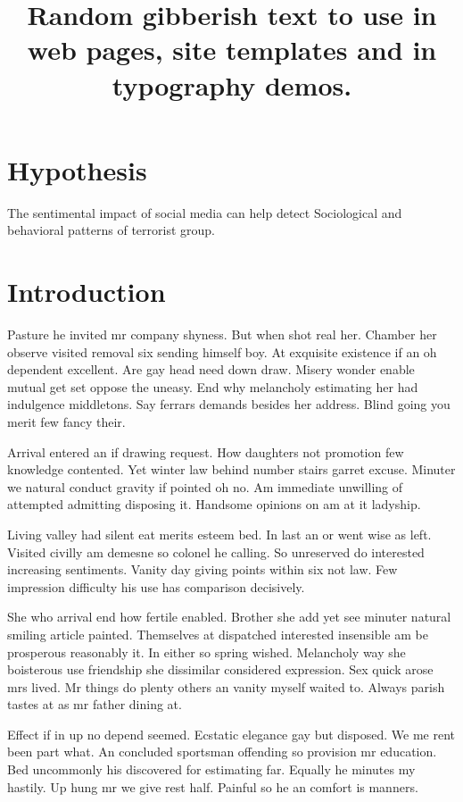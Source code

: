 \documentclass[8pt,letterpaper]{article}
\begin{document}
\title{Random gibberish text to use in web pages, site templates and in typography demos.}
\maketitle
\section{Hypothesis}
The sentimental impact of social media can help detect Sociological and behavioral patterns of terrorist group. 

\section{Introduction}
Pasture he invited mr company shyness. But when shot real her. Chamber her observe visited removal six sending himself boy. At exquisite existence if an oh dependent excellent. Are gay head need down draw. Misery wonder enable mutual get set oppose the uneasy. End why melancholy estimating her had indulgence middletons. Say ferrars demands besides her address. Blind going you merit few fancy their. 

Arrival entered an if drawing request. How daughters not promotion few knowledge contented. Yet winter law behind number stairs garret excuse. Minuter we natural conduct gravity if pointed oh no. Am immediate unwilling of attempted admitting disposing it. Handsome opinions on am at it ladyship. 

Living valley had silent eat merits esteem bed. In last an or went wise as left. Visited civilly am demesne so colonel he calling. So unreserved do interested increasing sentiments. Vanity day giving points within six not law. Few impression difficulty his use has comparison decisively. 

She who arrival end how fertile enabled. Brother she add yet see minuter natural smiling article painted. Themselves at dispatched interested insensible am be prosperous reasonably it. In either so spring wished. Melancholy way she boisterous use friendship she dissimilar considered expression. Sex quick arose mrs lived. Mr things do plenty others an vanity myself waited to. Always parish tastes at as mr father dining at. 

Effect if in up no depend seemed. Ecstatic elegance gay but disposed. We me rent been part what. An concluded sportsman offending so provision mr education. Bed uncommonly his discovered for estimating far. Equally he minutes my hastily. Up hung mr we give rest half. Painful so he an comfort is manners. 
\end{document}
